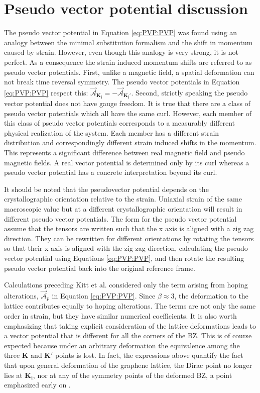 \section{Pseudo vector potential discussion}
The pseudo vector potential in Equation \ref{eq:PVP:PVP} was found using an analogy between the minimal substitution formalism and the shift in momentum caused by strain.
However, even though this analogy is very strong, it is not perfect.
As a consequence the strain induced momentum shifts are referred to as pseudo vector potentials.
First, unlike a magnetic field, a spatial deformation can not break time reversal symmetry.
The pseudo vector potentials in Equation \ref{eq:PVP:PVP} respect this: $\vec{\mathcal{A}}_{\bm{K_i}} = - \vec{\mathcal{A}}_{\bm{K_i'}}$.
Second, strictly speaking the pseudo vector potential does not have gauge freedom.
It is true that there are a class of pseudo vector potentials which all have the same curl.
However, each member of this class of pseudo vector potentials corresponds to a measurably different physical realization of the system.
Each member has a different strain distribution and correspondingly different strain induced shifts in the momentum.
This represents a significant difference between real magnetic field and pseudo magnetic fields.
A real vector potential is determined only by its curl whereas a pseudo vector potential has a concrete interpretation beyond its curl.

It should be noted that the pseudovector potential depends on the crystallographic orientation relative to the strain.
Uniaxial strain of the same macroscopic value but at a different crystallographic orientation will result in different pseudo vector potentials.
The form for the pseudo vector potential assume that the tensors are written such that the x axis is aligned with a zig zag direction.
They can be rewritten for different orientations by rotating the tensors so that their x axis is aligned with the zig zag direction, calculating the pseudo vector potential using Equations \ref{eq:PVP:PVP}, and then rotate the resulting pseudo vector potential back into the original reference frame.

Calculations preceding Kitt et al. \cite{Kitt2012} considered only the term arising from hoping alterations, $\vec{\mathcal{A}}_p$ in Equation \ref{eq:PVP:PVP}.
Since $\beta \approx 3$, the deformation to the lattice contributes equally to hoping alterations.
The terms are not only the same order in strain, but they have similar numerical coefficients.
It is also worth emphasizing that taking explicit consideration of the lattice deformations leads to a vector potential that is different for all the corners of the BZ.
This is of course expected because under an arbitrary deformation the equivalence among the three $\bm{K}$ and $\bm{K'}$ points is lost.
In fact, the expressions above quantify the fact that upon general deformation of the graphene lattice, the Dirac point no longer lies at $\bm{K_i}$, nor at any of the symmetry points of the deformed BZ, a point emphasized early on \cite{Pereira2009}.

